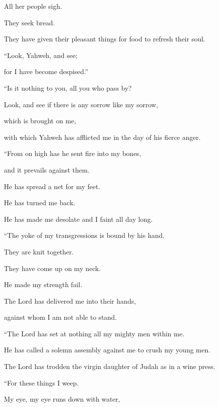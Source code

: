 {\par }{\BB \par }{\Q {}All her people sigh.
\par }{\QB They seek bread.
\par }{\QB They have given their pleasant things for food to refresh their soul.
\par }{\Q “Look, Yahweh, and see;
\par }{\QB for I have become despised.”
\par }{\BB \par }{\Q {}“Is it nothing to you, all you who pass by?
\par }{\QB Look, and see if there is any sorrow like my sorrow,
\par }{\QB which is brought on me,
\par }{\QB with which Yahweh has afflicted me in the day of his fierce anger.
\par }{\BB \par }{\Q {}“From on high has he sent fire into my bones,
\par }{\QB and it prevails against them.
\par }{\Q He has spread a net for my feet.
\par }{\QB He has turned me back.
\par }{\QB He has made me desolate and I faint all day long.
\par }{\BB \par }{\Q {}“The yoke of my transgressions is bound by his hand.
\par }{\QB They are knit together.
\par }{\QB They have come up on my neck.
\par }{\QB He made my strength fail.
\par }{\Q The Lord has delivered me into their hands,
\par }{\QB against whom I am not able to stand.
\par }{\BB \par }{\Q {}“The Lord has set at nothing all my mighty men within me.
\par }{\QB He has called a solemn assembly against me to crush my young men.
\par }{\QB The Lord has trodden the virgin daughter of Judah as in a wine press.
\par }{\BB \par }{\Q {}“For these things I weep.
\par }{\QB My eye, my eye runs down with water,
}

